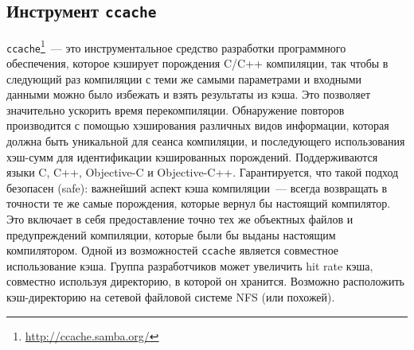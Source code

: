 \subsection{Инструмент \texttt{ccache}}
\texttt{ccache}\footnote{\url{http://ccache.samba.org/}}~--- это инструментальное средство разработки программного обеспечения, которое кэширует порождения C/C++ компиляции, так чтобы в следующий раз компиляции с теми же самыми параметрами и входными данными можно было избежать и взять результаты из кэша. Это позволяет значительно ускорить время перекомпиляции. Обнаружение повторов производится с помощью хэширования различных видов информации, которая должна быть уникальной для сеанса компиляции, и последующего использования хэш-сумм для идентификации кэшированных порождений. Поддерживаются языки C, C++, Objective-C и Objective-C++. Гарантируется, что такой подход безопасен (safe): важнейший аспект кэша компиляции~--- всегда возвращать в точности те же самые порождения, которые вернул бы настоящий компилятор. Это включает в себя предоставление точно тех же объектных файлов и предупреждений компиляции, которые были бы выданы настоящим компилятором.
Одной из возможностей \texttt{ccache} является совместное использование кэша. Группа разработчиков может увеличить hit rate кэша, совместно используя директорию, в которой он хранится. Возможно расположить кэш-директорию на сетевой файловой системе NFS (или похожей).